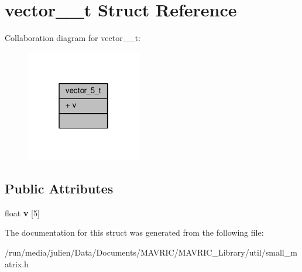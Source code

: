 \hypertarget{structvector__5__t}{\section{vector\+\_\+\_\+t Struct Reference}
\label{structvector__5__t}
}


Collaboration diagram for vector\+\_\+\_\+t\+:
\nopagebreak
\begin{figure}[H]
\begin{center}
\leavevmode
\includegraphics[width=142pt]{structvector__5__t__coll__graph}
\end{center}
\end{figure}
\subsection*{Public Attributes}
\begin{DoxyCompactItemize}
\item 
\hypertarget{structvector__5__t_a90c762d63a39ae54416aa2cc2abbf7ce}{float {\bfseries v} \mbox{[}5\mbox{]}}\label{structvector__5__t_a90c762d63a39ae54416aa2cc2abbf7ce}

\end{DoxyCompactItemize}


The documentation for this struct was generated from the following file\+:\begin{DoxyCompactItemize}
\item 
/run/media/julien/\+Data/\+Documents/\+M\+A\+V\+R\+I\+C/\+M\+A\+V\+R\+I\+C\+\_\+\+Library/util/small\+\_\+matrix.\+h\end{DoxyCompactItemize}
